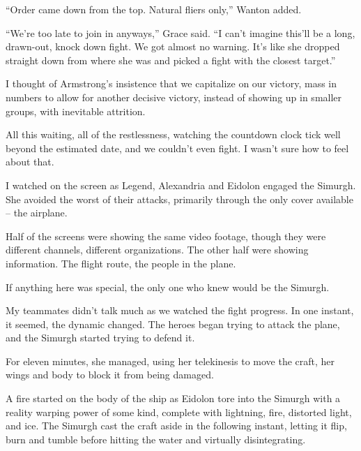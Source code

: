 ``Order came down from the top.  Natural fliers only,'' Wanton added.



``We're too late to join in anyways,'' Grace said.  ``I can't imagine this'll be a long, drawn-out, knock down fight.  We got almost no warning.  It's like she dropped straight down from where she was and picked a fight with the closest target.''



I thought of Armstrong's insistence that we capitalize on our victory, mass in numbers to allow for another decisive victory, instead of showing up in smaller groups, with inevitable attrition.



All this waiting, all of the restlessness, watching the countdown clock tick well beyond the estimated date, and we couldn't even fight.  I wasn't sure how to feel about that.



I watched on the screen as Legend, Alexandria and Eidolon engaged the Simurgh.  She avoided the worst of their attacks, primarily through the only cover available – the airplane.



Half of the screens were showing the same video footage, though they were different channels, different organizations.  The other half were showing information.  The flight route, the people in the plane.



If anything here was special, the only one who knew would be the Simurgh.



My teammates didn't talk much as we watched the fight progress.  In one instant, it seemed, the dynamic changed.  The heroes began trying to attack the plane, and the Simurgh started trying to defend it.



For eleven minutes, she managed, using her telekinesis to move the craft, her wings and body to block it from being damaged.



A fire started on the body of the ship as Eidolon tore into the Simurgh with a reality warping power of some kind, complete with lightning, fire, distorted light, and ice.  The Simurgh cast the craft aside in the following instant, letting it flip, burn and tumble before hitting the water and virtually disintegrating.



